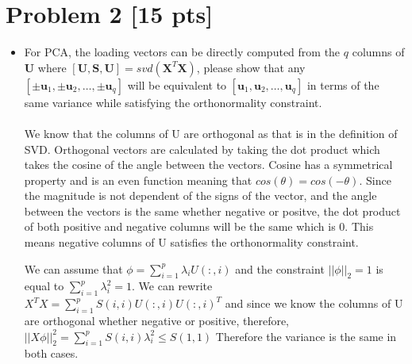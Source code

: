 \documentclass[11pt]{article}
\newcommand{\mtx}[1]{\mathbf{#1}}
\newcommand{\vct}[1]{\mathbf{#1}}
\def \mU {\mtx{U}}
\def \mS {\mtx{S}}
\def \mX {\mtx{X}}
\def \vu {\vct{u}}
\begin{document}
\newpage
\section*{Problem 2 [15 pts]}
\begin{itemize}
	\item For PCA, the loading vectors can be directly computed from the $q$ columns of  $\mU$ where  $[\mU,\mS,\mU]=svd(\mX^T\mX)$, please show that any $[\pm\vu_1,\pm\vu_2,\dots,\pm\vu_q]$ will be equivalent to $[\vu_1,\vu_2,\dots,\vu_q]$ in terms of the same variance while satisfying the orthonormality constraint.\\\\
	We know that the columns of U are orthogonal as that is in the definition of SVD. Orthogonal vectors are calculated by taking the dot product which takes the cosine of the angle between the vectors. Cosine has a symmetrical property and is an even function meaning that $cos(\theta) = cos(-\theta)$. Since the magnitude is not dependent of the signs of the vector, and the angle between the vectors is the same whether negative or positve, the dot product of both positive and negative columns will be the same which is 0. This means negative columns of U satisfies the orthonormality constraint. 
	
We can assume that $\phi = \sum^p_{i=1} \lambda_i U(:, i)$ and the constraint $||\phi||_2 = 1$ is equal to $\sum^p_{i=1} \lambda_i^2 = 1$. We can rewrite $X^TX = \sum^p_{i=1} S(i, i)U(:,i)U(:,i)^T$ and since we know the columns of U are orthogonal whether negative or positive, therefore, $||X\phi||_2^2 = \sum^p_{i=1} S(i,i)\lambda_i^2 \le S(1,1)$ Therefore the variance is the same in both cases. 


\end{itemize}
\end{document}
